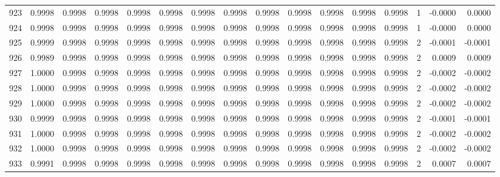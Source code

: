 \begin{tabular}{lrrrrrrrrrrrrrrr}
923 &      0.9998 &  0.9998 &  0.9998 &  0.9998 &  0.9998 &  0.9998 &  0.9998 &  0.9998 &  0.9998 &  0.9998 &   0.9998 &     0.9998 &      1 &                   -0.0000 &                     0.0000 \\
924 &      0.9998 &  0.9998 &  0.9998 &  0.9998 &  0.9998 &  0.9998 &  0.9998 &  0.9998 &  0.9998 &  0.9998 &   0.9998 &     0.9998 &      1 &                   -0.0000 &                     0.0000 \\
925 &      0.9999 &  0.9998 &  0.9998 &  0.9998 &  0.9998 &  0.9998 &  0.9998 &  0.9998 &  0.9998 &  0.9998 &   0.9998 &     0.9998 &      2 &                   -0.0001 &                    -0.0001 \\
926 &      0.9989 &  0.9998 &  0.9998 &  0.9998 &  0.9998 &  0.9998 &  0.9998 &  0.9998 &  0.9998 &  0.9998 &   0.9998 &     0.9998 &      2 &                    0.0009 &                     0.0009 \\
927 &      1.0000 &  0.9998 &  0.9998 &  0.9998 &  0.9998 &  0.9998 &  0.9998 &  0.9998 &  0.9998 &  0.9998 &   0.9998 &     0.9998 &      2 &                   -0.0002 &                    -0.0002 \\
928 &      1.0000 &  0.9998 &  0.9998 &  0.9998 &  0.9998 &  0.9998 &  0.9998 &  0.9998 &  0.9998 &  0.9998 &   0.9998 &     0.9998 &      2 &                   -0.0002 &                    -0.0002 \\
929 &      1.0000 &  0.9998 &  0.9998 &  0.9998 &  0.9998 &  0.9998 &  0.9998 &  0.9998 &  0.9998 &  0.9998 &   0.9998 &     0.9998 &      2 &                   -0.0002 &                    -0.0002 \\
930 &      0.9999 &  0.9998 &  0.9998 &  0.9998 &  0.9998 &  0.9998 &  0.9998 &  0.9998 &  0.9998 &  0.9998 &   0.9998 &     0.9998 &      2 &                   -0.0001 &                    -0.0001 \\
931 &      1.0000 &  0.9998 &  0.9998 &  0.9998 &  0.9998 &  0.9998 &  0.9998 &  0.9998 &  0.9998 &  0.9998 &   0.9998 &     0.9998 &      2 &                   -0.0002 &                    -0.0002 \\
932 &      1.0000 &  0.9998 &  0.9998 &  0.9998 &  0.9998 &  0.9998 &  0.9998 &  0.9998 &  0.9998 &  0.9998 &   0.9998 &     0.9998 &      2 &                   -0.0002 &                    -0.0002 \\
933 &      0.9991 &  0.9998 &  0.9998 &  0.9998 &  0.9998 &  0.9998 &  0.9998 &  0.9998 &  0.9998 &  0.9998 &   0.9998 &     0.9998 &      2 &                    0.0007 &                     0.0007 \\

\end{tabular}
